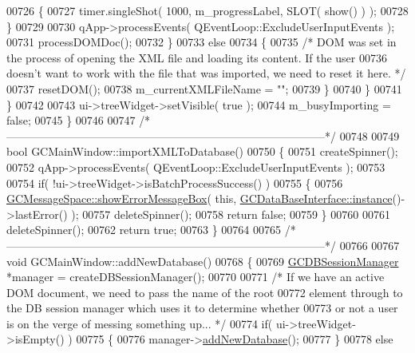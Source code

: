 \begin{DoxyCode}
{{{{00726         \{
00727           timer.singleShot( 1000, m\_progressLabel, SLOT( show() ) );
00728         \}
00729 
00730         qApp->processEvents( QEventLoop::ExcludeUserInputEvents );
00731         processDOMDoc();
00732       \}
00733       \textcolor{keywordflow}{else}
00734       \{
00735         \textcolor{comment}{/* DOM was set in the process of opening the XML file and loading its
       content.  If the user}
00736 \textcolor{comment}{            doesn't want to work with the file that was imported, we need to
       reset it here. */}
00737         resetDOM();
00738         m\_currentXMLFileName = \textcolor{stringliteral}{""};
00739       \}
00740     \}
00741   \}
00742 
00743   ui->treeWidget->setVisible( \textcolor{keyword}{true} );
00744   m\_busyImporting = \textcolor{keyword}{false};
00745 \}
00746 
00747 \textcolor{comment}{/*
      --------------------------------------------------------------------------------------*/}
00748 
00749 \textcolor{keywordtype}{bool} GCMainWindow::importXMLToDatabase()
00750 \{
00751   createSpinner();
00752   qApp->processEvents( QEventLoop::ExcludeUserInputEvents );
00753 
00754   \textcolor{keywordflow}{if}( !ui->treeWidget->isBatchProcessSuccess() )
00755   \{
00756     \hyperlink{namespace_g_c_message_space_ab118b3a133686167617eb955029fd44e}{GCMessageSpace::showErrorMessageBox}( \textcolor{keyword}{this}, \hyperlink{class_g_c_data_base_interface_a1baea9c0667aa8b610ec30076fcab84c}{GCDataBaseInterface::instance}()-
      >lastError() );
00757     deleteSpinner();
00758     \textcolor{keywordflow}{return} \textcolor{keyword}{false};
00759   \}
00760 
00761   deleteSpinner();
00762   \textcolor{keywordflow}{return} \textcolor{keyword}{true};
00763 \}
00764 
00765 \textcolor{comment}{/*
      --------------------------------------------------------------------------------------*/}
00766 
00767 \textcolor{keywordtype}{void} GCMainWindow::addNewDatabase()
00768 \{
00769   \hyperlink{class_g_c_d_b_session_manager}{GCDBSessionManager} *manager = createDBSessionManager();
00770 
00771   \textcolor{comment}{/* If we have an active DOM document, we need to pass the name of the root}
00772 \textcolor{comment}{    element through to the DB session manager which uses it to determine
       whether}
00773 \textcolor{comment}{    or not a user is on the verge of messing something up... */}
00774   \textcolor{keywordflow}{if}( ui->treeWidget->isEmpty() )
00775   \{
00776     manager->\hyperlink{class_g_c_d_b_session_manager_ad029ca4ec8ffff788a281f1b3f3eee71}{addNewDatabase}();
00777   \}
00778   \textcolor{keywordflow}{else}
}}}}
\end{DoxyCode}
